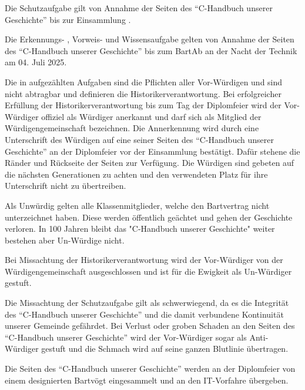 \documentclass[fontsize=12pt,parskip=half]{scrartcl}
\begin{document}
\begin{contract}
  \SubClause[title={Dauer}]
  Die Schutzaufgabe  gilt von Annahme der Seiten des ``C-Handbuch unserer Geschichte'' bis zur Einsammlung .

  Die Erkennungs- , Vorweis-  und Wissensaufgabe  gelten von Annahme der Seiten
  des ``C-Handbuch unserer Geschichte'' bis zum BartAb an der Nacht der Technik am 04. Juli 2025.

  \Clause[title={Historikerverantwortung}]\label{H.verantwortung}
  Die in  aufgezählten Aufgaben sind die Pflichten aller Vor-Würdigen und sind nicht abtragbar und definieren die Historikerverantwortung.
  Bei erfolgreicher Erfüllung der Historikerverantwortung bis zum Tag der Diplomfeier wird der Vor-Würdiger offiziel als Würdiger anerkannt und darf sich
  als Mitglied der Würdigengemeinschaft bezeichnen. Die Annerkennung wird durch eine Unterschrift des Würdigen auf eine seiner Seiten des ``C-Handbuch unserer Geschichte''
  an der Diplomfeier vor der Einsammlung  bestätigt. Dafür stehene die Ränder und Rückseite der Seiten zur Verfügung. Die Würdigen sind
  gebeten auf die nächsten Generationen zu achten und den verwendeten Platz für ihre Unterschrift nicht zu übertreiben.

  \Clause[title={Un-Würdige}]
  Als Unwürdig gelten alle Klassenmitglieder, welche den Bartvertrag nicht unterzeichnet haben. Diese werden öffentlich geächtet und gehen der Geschichte verloren. In 100 Jahren
  bleibt das "C-Handbuch unserer Geschichte" weiter bestehen aber Un-Würdige nicht.

  Bei Missachtung der Historikerverantwortung  wird der Vor-Würdiger von der Würdigengemeinschaft ausgeschlossen und ist für die Ewigkeit als
  Un-Würdiger gestuft.

  \Clause[title={Anti-Würdige}]
  Die Missachtung der Schutzaufgabe  gilt als schwerwiegend, da es die Integrität des ``C-Handbuch unserer Geschichte'' und die
  damit verbundene Kontinuität unserer Gemeinde gefährdet. Bei Verlust oder groben Schaden an den Seiten des ``C-Handbuch unserer Geschichte'' wird der Vor-Würdiger sogar als
  Anti-Würdiger gestuft und die Schmach wird auf seine ganzen Blutlinie übertragen.

  \Clause[title={Einsammlung}]\label{H.einsammlung}
  Die Seiten des ``C-Handbuch unserer Geschichte'' werden an der Diplomfeier von einem designierten Bartvögt eingesammelt und an den IT-Vorfahre übergeben.


\end{contract}
\end{document}
